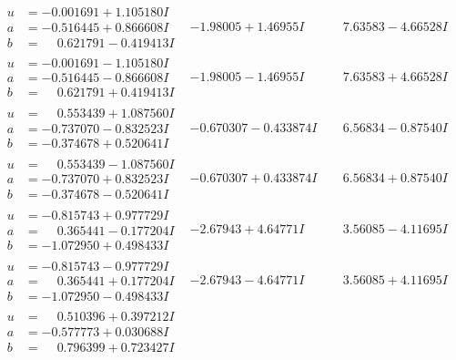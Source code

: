 \documentclass[1p]{elsarticle_modified}
\theoremstyle{definition}
\begin{document}
$$\begin{array}{c|c|c}
\begin{aligned}
u &= -0.001691 + 1.105180 I \\
a &= -0.516445 + 0.866608 I \\
b &= \phantom{-}0.621791 - 0.419413 I\end{aligned}
 & -1.98005 + 1.46955 I & \phantom{-}7.63583 - 4.66528 I \\ \hline\begin{aligned}
u &= -0.001691 - 1.105180 I \\
a &= -0.516445 - 0.866608 I \\
b &= \phantom{-}0.621791 + 0.419413 I\end{aligned}
 & -1.98005 - 1.46955 I & \phantom{-}7.63583 + 4.66528 I \\ \hline\begin{aligned}
u &= \phantom{-}0.553439 + 1.087560 I \\
a &= -0.737070 - 0.832523 I \\
b &= -0.374678 + 0.520641 I\end{aligned}
 & -0.670307 - 0.433874 I & \phantom{-}6.56834 - 0.87540 I \\ \hline\begin{aligned}
u &= \phantom{-}0.553439 - 1.087560 I \\
a &= -0.737070 + 0.832523 I \\
b &= -0.374678 - 0.520641 I\end{aligned}
 & -0.670307 + 0.433874 I & \phantom{-}6.56834 + 0.87540 I \\ \hline\begin{aligned}
u &= -0.815743 + 0.977729 I \\
a &= \phantom{-}0.365441 - 0.177204 I \\
b &= -1.072950 + 0.498433 I\end{aligned}
 & -2.67943 + 4.64771 I & \phantom{-}3.56085 - 4.11695 I \\ \hline\begin{aligned}
u &= -0.815743 - 0.977729 I \\
a &= \phantom{-}0.365441 + 0.177204 I \\
b &= -1.072950 - 0.498433 I\end{aligned}
 & -2.67943 - 4.64771 I & \phantom{-}3.56085 + 4.11695 I \\ \hline\begin{aligned}
u &= \phantom{-}0.510396 + 0.397212 I \\
a &= -0.577773 + 0.030688 I \\
b &= \phantom{-}0.796399 + 0.723427 I\end{aligned}

\end{array}$$
\end{document}
